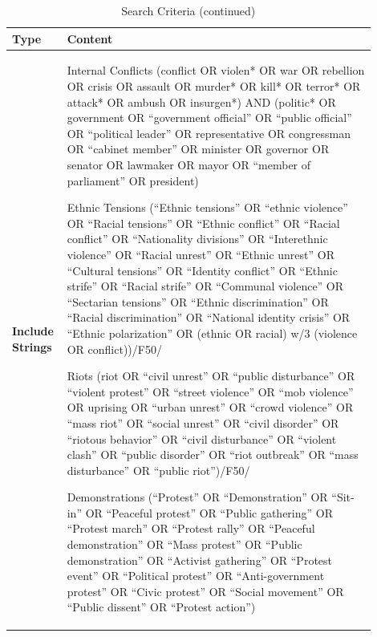 \begin{table}[h]
   \caption*{Search Criteria (continued)}
   \centering
   \scriptsize
   \begin{tabular}{|p{0.1\linewidth}|p{0.8\linewidth}|}
   \hline
   \textbf{Type} & \textbf{Content} \\ \hline
   \textbf{Include Strings} & 
Internal Conflicts \newline
   (conflict OR violen* OR war OR rebellion OR crisis OR assault OR murder* OR kill* OR terror* OR attack* OR ambush OR insurgen*) 
   AND (politic* OR government OR ``government official'' OR ``public official'' OR ``political leader'' OR representative OR congressman OR ``cabinet member'' OR minister OR governor OR senator OR lawmaker OR mayor OR ``member of parliament'' OR president) \newline 


Ethnic Tensions \newline
   (``Ethnic tensions'' OR ``ethnic violence'' OR ``Racial tensions'' OR ``Ethnic conflict'' OR ``Racial conflict'' OR ``Nationality divisions'' OR ``Interethnic violence'' OR ``Racial unrest'' OR ``Ethnic unrest'' OR ``Cultural tensions'' OR ``Identity conflict'' OR ``Ethnic strife'' OR ``Racial strife'' OR ``Communal violence'' OR ``Sectarian tensions'' OR ``Ethnic discrimination'' OR ``Racial discrimination'' OR ``National identity crisis'' OR ``Ethnic polarization'' OR (ethnic OR racial) w/3 (violence OR conflict))/F50/ \newline 

Riots \newline
   (riot OR ``civil unrest'' OR ``public disturbance'' OR ``violent protest'' OR ``street violence'' OR ``mob violence'' OR uprising OR ``urban unrest'' OR ``crowd violence'' OR ``mass riot'' OR ``social unrest'' OR ``civil disorder'' OR ``riotous behavior'' OR ``civil disturbance'' OR ``violent clash'' OR ``public disorder'' OR ``riot outbreak'' OR ``mass disturbance'' OR ``public riot'')/F50/ \newline 

Demonstrations \newline
   (``Protest'' OR ``Demonstration'' OR ``Sit-in'' OR ``Peaceful protest'' OR ``Public gathering'' OR ``Protest march'' OR ``Protest rally'' OR ``Peaceful demonstration'' OR ``Mass protest'' OR ``Public demonstration'' OR ``Activist gathering'' OR ``Protest event'' OR ``Political protest'' OR ``Anti-government protest'' OR ``Civic protest'' OR ``Social movement'' OR ``Public dissent'' OR ``Protest action'') \newline 


\end{tabular}
\end{table}
